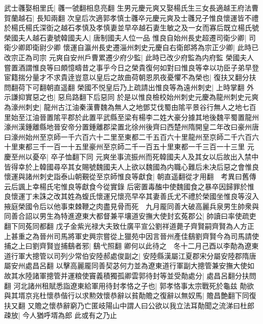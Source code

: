 武士彠娶相里氏|{
	彠一虢翻相息亮翻}
生男元慶元爽又娶楊氏生三女長適越王府法曹賀蘭越石|{
	長知兩翻}
次皇后次適郭孝慎士彠卒元慶元爽及士彠兄子惟良懷運皆不禮於楊氏楊氏深衘之越石孝慎及孝慎妻並早卒越石妻生敏之及一女而寡后既立楊氏號榮國夫人越石妻號韓國夫人|{
	唐制國夫人位一品}
惟良自始州長史超遷司衛少卿|{
	司衛少卿即衛尉少卿}
懷運自瀛州長史遷淄州刺史元慶自右衛郎將為宗正少卿|{
	此時已改宗正為司宗}
元爽自安州戶曹累遷少府少監|{
	此時已改少府監為内府監}
榮國夫人嘗置酒謂惟良等曰頗憶疇昔之事乎今日之榮貴復何如對曰惟良等幸以功臣子弟早登宦籍揣分量才不求貴逹豈意以皇后之故曲荷朝恩夙夜憂懼不為榮也|{
	復扶又翻分扶問翻荷下可翻朝直遥翻}
榮國不悦皇后乃上疏請出惟良等為遠州刺史|{
	上時掌翻}
外示謙抑實惡之也|{
	惡烏路翻下后惡同}
於是以惟良檢校始州刺史元慶為龍州刺史元爽為濠州刺史|{
	龍州古江油秦漢曹魏為無人之地鄧艾伐蜀由隂平景谷行無人之地七百里始至江油晉置隂平郡於此置平武縣至梁有楊李二姓大豪分據其地後魏平蜀置龍州濠州漢鍾離縣地晉安帝分置鍾離郡梁置北徐州後齊曰西楚州隋開皇二年改曰豪州唐曰濠州始州至京師一千六百六十二里至東都二千五百六十里龍州至京師二千六百六十里東都三千一百一十五里豪州至京師二千一百五十里東都一千三百一十三里}
元慶至州以憂卒|{
	卒子恤翻下同}
元爽坐事流振州而死韓國夫人及其女以后故出入禁中皆得幸於上韓國尋卒其女賜號魏國夫人上欲以魏國為内職心難后未决后惡之會惟良懷運與諸州刺史詣泰山朝覲從至京師惟良等獻食|{
	朝直遥翻從才用翻　考異曰舊傳云后諷上幸楊氏宅惟良等獻食今從實錄}
后密置毒醢中使魏國食之暴卒因歸罪於惟良懷運丁未誅之改其姓為蝮氏懷運兄懷亮早卒其妻善氏尤不禮於榮國坐惟良等沒入掖庭榮國令后以他事束棘鞭之肉盡見骨而死　九月龎同善大破高麗兵泉男生帥衆與同善合詔以男生為特進遼東大都督兼平壤道安撫大使封玄菟郡公|{
	帥讀曰率使疏吏翻下同菟同都翻}
戊子金紫光禄大夫致仕廣平宣公劉祥道薨子齊賢嗣齊賢為人方正上甚重之為晉州司馬將軍史興宗嘗從上獵苑中因言晉州產佳鷂劉齊賢今為司馬請使捕之上曰劉齊賢豈捕鷂者邪|{
	鷂弋照翻}
卿何以此待之　冬十二月己酉以李勣為遼東道行軍大摠管以司列少常伯安陸郝處俊副之|{
	安陸縣漢屬江夏郡宋分屬安陸郡隋唐屬安州處昌呂翻}
以擊高麗龎同善契苾何力並為遼東道行軍副大摠管兼安撫大使如故其水陸諸軍摠管并運粮使竇義積獨孤卿雲郭待封等並受勣處分|{
	處昌呂翻分扶問翻}
河北諸州租賦悉詣遼東給軍用待封孝恪之子也|{
	郭孝恪事太宗戰死於龜兹}
勣欲與其壻京兆杜懷恭偕行以求勲效懷恭辭以貧勣贍之復辭以無奴馬|{
	贍昌艶翻下同復扶又翻}
又贍之懷恭辭窮乃亡匿岐陽山中謂人曰公欲以我立法耳勣聞之流涕曰杜郎疎放|{
	今人猶呼壻為郎}
此或有之乃止

